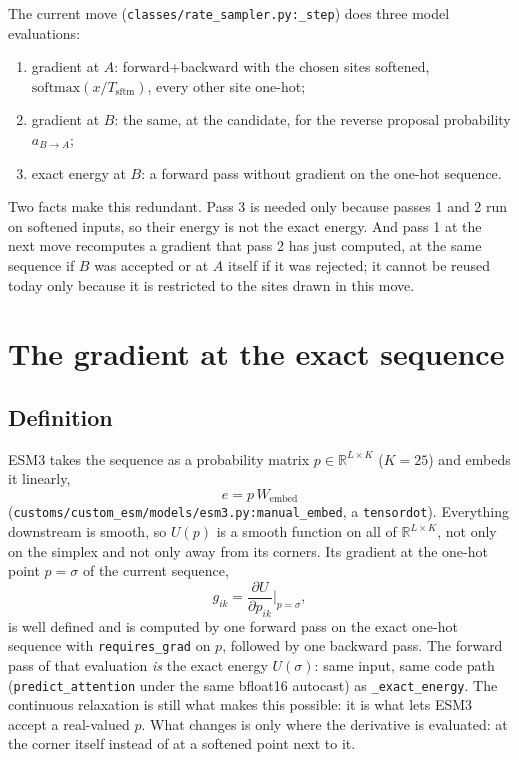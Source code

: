 \documentclass[11pt,a4paper]{article}
\newcommand{\Tsftm}{T_{\mathrm{sftm}}}
\newcommand{\file}[1]{\texttt{#1}}
\begin{document}
The current move (\file{classes/rate\_sampler.py:\_step}) does three model
evaluations:
\begin{enumerate}
  \item gradient at $A$: forward+backward with the chosen sites softened,
        $\mathrm{softmax}(x/\Tsftm)$, every other site one-hot;
  \item gradient at $B$: the same, at the candidate, for the reverse proposal
        probability $a_{B\to A}$;
  \item exact energy at $B$: a forward pass without gradient on the one-hot
        sequence.
\end{enumerate}
Two facts make this redundant. Pass 3 is needed only because passes 1 and 2
run on softened inputs, so their energy is not the exact energy. And pass 1 at
the next move recomputes a gradient that pass 2 has just computed, at the same
sequence if $B$ was accepted or at $A$ itself if it was rejected; it cannot be
reused today only because it is restricted to the sites drawn in this move.

\section{The gradient at the exact sequence}
\subsection{Definition}
ESM3 takes the sequence as a probability matrix $p\in\mathbb{R}^{L\times K}$
($K=25$) and embeds it linearly,
\begin{equation}
  e = p\,W_{\mathrm{embed}}
\end{equation}
(\file{customs/custom\_esm/models/esm3.py:manual\_embed}, a
\texttt{tensordot}). Everything downstream is smooth, so $U(p)$ is a smooth
function on all of $\mathbb{R}^{L\times K}$, not only on the simplex and not
only away from its corners. Its gradient at the one-hot point $p=\sigma$ of the
current sequence,
\begin{equation}
  g_{ik} = \frac{\partial U}{\partial p_{ik}}\bigg|_{p=\sigma},
\end{equation}
is well defined and is computed by one forward pass on the exact one-hot
sequence with \texttt{requires\_grad} on $p$, followed by one backward pass. The
forward pass of that evaluation \emph{is} the exact energy $U(\sigma)$: same
input, same code path (\texttt{predict\_attention} under the same bfloat16
autocast) as \texttt{\_exact\_energy}. The continuous relaxation is still what
makes this possible: it is what lets ESM3 accept a real-valued $p$. What changes
is only where the derivative is evaluated: at the corner itself instead of at a
softened point next to it.
\end{document}
